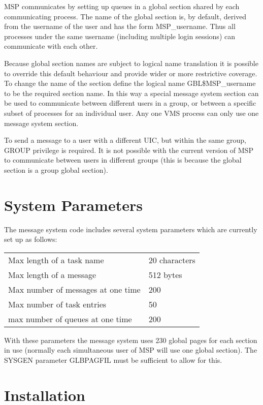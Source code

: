 MSP communicates by setting up queues in a global section shared by each
communicating process. The name of the global section is, by default, derived 
from the username of the user and has the form MSP\_username. Thus all
processes under the same username (including multiple login sessions) can
communicate with each other.

Because global section names are subject to logical name translation it
is possible to override this default behaviour and provide wider or
more restrictive coverage. To change the name of the section define the
logical name GBL\$MSP\_username to be the required section name. In this way
a special message system section can be used to communicate between
different users in a group, or between a specific subset of processes for
an individual user. Any one VMS process can only use one message system
section.

To send a message to a user with a different UIC, but within the same group,
GROUP privilege is required. It is not possible with the current version
of MSP to communicate between users in different groups (this is because
the global section is a group global section).

\section{System Parameters}

The message system code includes several system parameters which are
currently set up as follows:

\begin{tabular}{|l|l|}  \hline
  Max length of a task name     &          20 characters   \\
  Max length of a message       &          512 bytes      \\
  Max number of messages at one time   &   200    \\
  Max number of task entries           &   50     \\
  max number of queues at one time     &   200     \\ \hline
\end{tabular}

With these parameters the message system uses 230 global pages for each
section in use (normally each simultaneous user of MSP will use one
global section). The SYSGEN parameter GLBPAGFIL must be sufficient to
allow for this.

\section{Installation}

